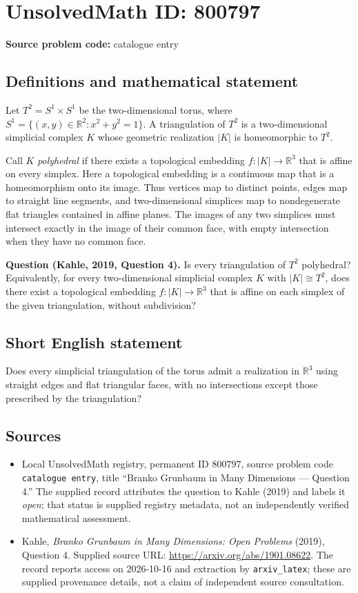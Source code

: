 \documentclass[11pt]{article}
\newcommand{\R}{\mathbb{R}}
\begin{document}
\section*{UnsolvedMath ID: 800797}
\textbf{Source problem code:} catalogue entry
\subsection{Definitions and mathematical statement}
Let \(T^2=S^1\times S^1\) be the two-dimensional torus, where \(S^1=\{(x,y)\in\R^2:x^2+y^2=1\}\). A triangulation of \(T^2\) is a two-dimensional simplicial complex \(K\) whose geometric realization \(|K|\) is homeomorphic to \(T^2\).

Call \(K\) \emph{polyhedral} if there exists a topological embedding \(f:|K|\to\R^3\) that is affine on every simplex. Here a topological embedding is a continuous map that is a homeomorphism onto its image. Thus vertices map to distinct points, edges map to straight line segments, and two-dimensional simplices map to nondegenerate flat triangles contained in affine planes. The images of any two simplices must intersect exactly in the image of their common face, with empty intersection when they have no common face.

\textbf{Question (Kahle, 2019, Question 4).} Is every triangulation of \(T^2\) polyhedral? Equivalently, for every two-dimensional simplicial complex \(K\) with \(|K|\cong T^2\), does there exist a topological embedding \(f:|K|\to\R^3\) that is affine on each simplex of the given triangulation, without subdivision?
\subsection{Short English statement}
Does every simplicial triangulation of the torus admit a realization in \(\R^3\) using straight edges and flat triangular faces, with no intersections except those prescribed by the triangulation?
\subsection{Sources}
\begin{itemize}
\item Local UnsolvedMath registry, permanent ID \(800797\), source problem code \texttt{catalogue entry}, title ``Branko Grunbaum in Many Dimensions --- Question 4.'' The supplied record attributes the question to Kahle (2019) and labels it \emph{open}; that status is supplied registry metadata, not an independently verified mathematical assessment.
\item Kahle, \emph{Branko Grunbaum in Many Dimensions: Open Problems} (2019), Question 4. Supplied source URL: \url{https://arxiv.org/abs/1901.08622}. The record reports access on 2026-10-16 and extraction by \texttt{arxiv\_latex}; these are supplied provenance details, not a claim of independent source consultation.
\end{itemize}
\end{document}
